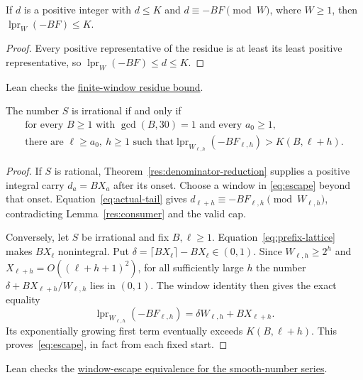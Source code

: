 \documentclass[11pt]{article}
\begin{document}
\begin{lemma}\label{res:consumer}
If $d$ is a positive integer with $d\le K$ and $d\equiv -BF\pmod W$,
where $W\ge1$, then $\operatorname{lpr}_W(-BF)\le K$.
\end{lemma}
\begin{proof}
Every positive representative of the residue is at least its least
positive representative, so $\operatorname{lpr}_W(-BF)\le d\le K$.
\end{proof}

\noindent Lean checks the \href{https://github.com/wcook04/plectis-erdos/blob/f36a98bf3d3e6f65f1074e3b800e3293d5b8a51a/ErdosProblems/Erdos269/PaperR7BasicAssembly.lean#L138}{finite-window residue bound}.

\begin{theorem}\label{res:windowconsumer}
The number $S$ is irrational if and only if
\begin{equation}\label{eq:escape}
 \begin{gathered}
 \text{for every }B\ge1\text{ with }\gcd(B,30)=1
 \text{ and every }a_0\ge1,\\
 \text{there are }\ell\ge a_0,\ h\ge1\text{ such that}
 \operatorname{lpr}_{W_{\ell,h}}(-BF_{\ell,h})>K(B,\ell+h).
 \end{gathered}
\end{equation}
\end{theorem}
\begin{proof}
If $S$ is rational, Theorem~\ref{res:denominator-reduction} supplies a
positive integral carry $d_a=BX_a$ after its onset.  Choose a window in
\eqref{eq:escape} beyond that onset.  Equation~\eqref{eq:actual-tail}
gives $d_{\ell+h}\equiv-BF_{\ell,h}\pmod{W_{\ell,h}}$, contradicting
Lemma~\ref{res:consumer} and the valid cap.

Conversely, let $S$ be irrational and fix $B,\ell\ge1$.
Equation~\eqref{eq:prefix-lattice} makes $BX_\ell$ nonintegral.
Put $\delta=\lceil BX_\ell\rceil-BX_\ell\in(0,1)$.
Since $W_{\ell,h}\ge2^h$ and $X_{\ell+h}=O((\ell+h+1)^2)$, for all
sufficiently large $h$ the number
$\delta+BX_{\ell+h}/W_{\ell,h}$ lies in $(0,1)$.  The window identity
then gives the exact equality
\[
 \operatorname{lpr}_{W_{\ell,h}}(-BF_{\ell,h})
 =\delta W_{\ell,h}+BX_{\ell+h}.
\]
Its exponentially growing first term eventually exceeds
$K(B,\ell+h)$.  This proves~\eqref{eq:escape}, in fact from each fixed start.
\end{proof}

\noindent Lean checks the \href{https://github.com/wcook04/plectis-erdos/blob/f36a98bf3d3e6f65f1074e3b800e3293d5b8a51a/ErdosProblems/Erdos269/PaperR7WindowResults.lean#L51}{window-escape equivalence for the smooth-number series}.
\end{document}

